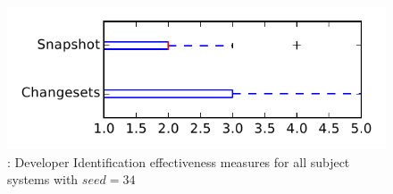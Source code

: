 
\begin{figure}
\centering
\includegraphics[height=0.4\textheight]{figures/dit_seed/rq1_tiny_34}
\caption{\rtwo: Developer Identification effectiveness measures for all subject systems with $seed=34$}
\label{fig:dit_seed:rq1:tiny}
\end{figure}
